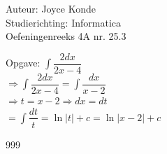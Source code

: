 \documentclass[a4paper]{article}
\begin{document}
  
\noindent \large Auteur: Joyce Konde \\
\noindent \large Studierichting: Informatica\\
\noindent \large Oefeningenreeks 4A nr. 25.3\\

\medskip

\normalsize

\newcommand{\dint}{\displaystyle\int}

\medskip

\normalsize

Opgave: $\dint \dfrac{2dx}{2x - 4}$\\

$\Rightarrow \dint \dfrac{2dx}{2x - 4} = \dint \dfrac{dx}{x - 2}$\\

$\Rightarrow t = x - 2 \Rightarrow dx = dt $\\

$= \dint \dfrac{dt}{t} = \ln |t| + c = \ln |x-2| + c$\\

\begin{thebibliography}{999}
\end{thebibliography}
\end{document}
